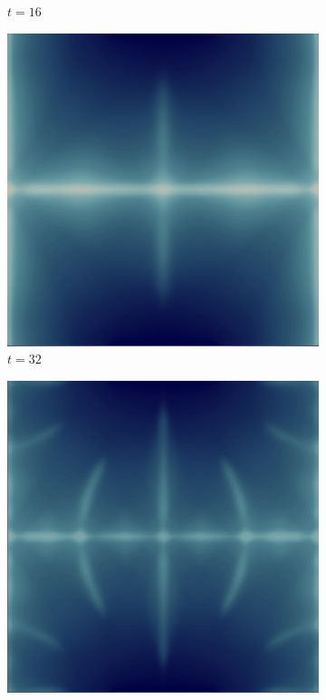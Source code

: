 \begin{figure}[H]
\begin{subfigure}{.4\textwidth}
        \caption{$t = 16$}
    \end{subfigure}
    \begin{subfigure}{.4\textwidth}
        \includegraphics[width=\textwidth]{imgs/UnitSquare2_State/third.png}
        \caption{$t = 32$}
    \end{subfigure}
    \begin{subfigure}{.4\textwidth}
        \includegraphics[width=\textwidth]{imgs/UnitSquare2_State/fourth.png}

\end{subfigure}
\end{figure}
